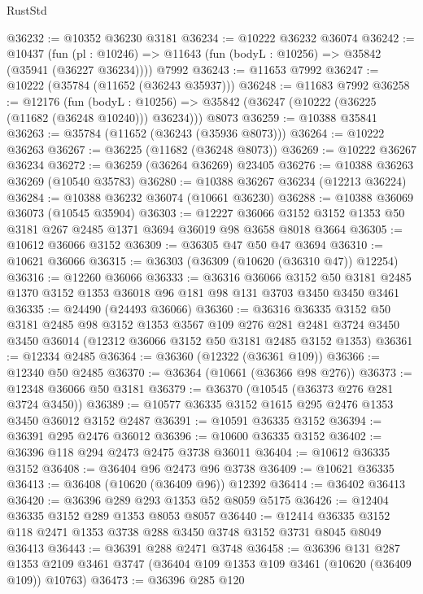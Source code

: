\begin{lexlean}{RustStd}
\begin{coremodule}
@36232 := @10352 @36230 @3181
@36234 := @10222 @36232 @36074
@36242 := @10437
    (fun (pl : @10246) => @11643 (fun (bodyL : @10256) => @35842 (@35941 (@36227 @36234))))
    @7992
@36243 := @11653 @7992
@36247 := @10222 (@35784 (@11652 (@36243 @35937)))
@36248 := @11683 @7992
@36258 := @12176
    (fun (bodyL : @10256) => @35842 (@36247 (@10222 (@36225 (@11682 (@36248 @10240))) @36234)))
    @8073
@36259 := @10388 @35841
@36263 := @35784 (@11652 (@36243 (@35936 @8073)))
@36264 := @10222 @36263
@36267 := @36225 (@11682 (@36248 @8073))
@36269 := @10222 @36267 @36234
@36272 := @36259 (@36264 @36269) @23405
@36276 := @10388 @36263 @36269 (@10540 @35783)
@36280 := @10388 @36267 @36234 (@12213 @36224)
@36284 := @10388 @36232 @36074 (@10661 @36230)
@36288 := @10388 @36069 @36073 (@10545 @35904)
@36303 := @12227
    @36066
    @3152
    @3152
    @1353
    @50
    @3181
    @267
    @2485
    @1371
    @3694
    @36019
    @98
    @3658
    @8018
    @3664
@36305 := @10612 @36066 @3152
@36309 := @36305 @47 @50 @47 @3694
@36310 := @10621 @36066
@36315 := @36303 (@36309 (@10620 (@36310 @47)) @12254)
@36316 := @12260 @36066
@36333 := @36316
    @36066
    @3152
    @50
    @3181
    @2485
    @1370
    @3152
    @1353
    @36018
    @96
    @181
    @98
    @131
    @3703
    @3450
    @3450
    @3461
@36335 := @24490 (@24493 @36066)
@36360 := @36316
    @36335
    @3152
    @50
    @3181
    @2485
    @98
    @3152
    @1353
    @3567
    @109
    @276
    @281
    @2481
    @3724
    @3450
    @3450
    @36014
    (@12312 @36066 @3152 @50 @3181 @2485 @3152 @1353)
@36361 := @12334 @2485
@36364 := @36360 (@12322 (@36361 @109))
@36366 := @12340 @50 @2485
@36370 := @36364 (@10661 (@36366 @98 @276))
@36373 := @12348 @36066 @50 @3181
@36379 := @36370 (@10545 (@36373 @276 @281 @3724 @3450))
@36389 := @10577 @36335 @3152 @1615 @295 @2476 @1353 @3450 @36012 @3152 @2487
@36391 := @10591 @36335 @3152
@36394 := @36391 @295 @2476 @36012
@36396 := @10600 @36335 @3152
@36402 := @36396 @118 @294 @2473 @2475 @3738 @36011
@36404 := @10612 @36335 @3152
@36408 := @36404 @96 @2473 @96 @3738
@36409 := @10621 @36335
@36413 := @36408 (@10620 (@36409 @96)) @12392
@36414 := @36402 @36413
@36420 := @36396 @289 @293 @1353 @52 @8059 @5175
@36426 := @12404 @36335 @3152 @289 @1353 @8053 @8057
@36440 := @12414 @36335 @3152 @118 @2471 @1353 @3738 @288 @3450 @3748 @3152 @3731 @8045 @8049 @36413
@36443 := @36391 @288 @2471 @3748
@36458 := @36396
    @131
    @287
    @1353
    @2109
    @3461
    @3747
    (@36404 @109 @1353 @109 @3461 (@10620 (@36409 @109)) @10763)
@36473 := @36396
    @285
    @120

\end{coremodule}
\end{lexlean}
